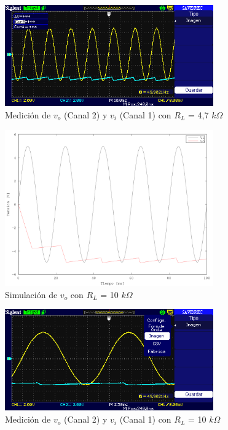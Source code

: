 \begin{figure}[H]
  \centering
      \includegraphics[width=0.8\textwidth]{gfxsantiago/FIG_MED_Rectificador_Precision_4B2.png}
  \caption{Medición de $v_{o}$ (Canal 2) y $v_{i}$ (Canal 1) con $R_{L}$ = 4,7 $k\Omega$}
\end{figure}

\begin{figure}[H]
  \centering
      \includegraphics[width=0.8\textwidth]{gfxsantiago/FIG_SIM_Rectificador_Precision_4B3.png}
  \caption{Simulación de $v_{o}$ con $R_{L}$ = 10 $k\Omega$}
\end{figure}

\begin{figure}[H]
  \centering
      \includegraphics[width=0.8\textwidth]{gfxsantiago/FIG_MED_Rectificador_Precision_4B3.png}
  \caption{Medición de $v_{o}$ (Canal 2) y $v_{i}$ (Canal 1) con $R_{L}$ = 10 $k\Omega$}
  \label{fig:med_4B3}
\end{figure}

